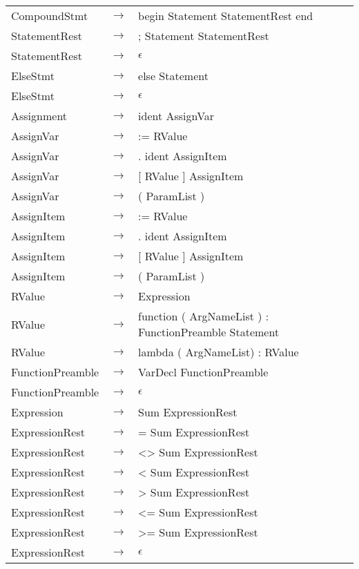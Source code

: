 \documentclass[10pt,a4paper]{article}
\begin{document}
\begin{longtable}{ l c l }
	CompoundStmt     & $\rightarrow$ & begin Statement StatementRest end \\
	
	StatementRest    & $\rightarrow$ & ; Statement StatementRest \\
	StatementRest    & $\rightarrow$ & $\epsilon$ \\

	ElseStmt         & $\rightarrow$ & else Statement \\
	ElseStmt         & $\rightarrow$ & $\epsilon$ \\

	Assignment       & $\rightarrow$ & ident AssignVar \\
	
	AssignVar        & $\rightarrow$ & := RValue \\
	AssignVar        & $\rightarrow$ & . ident AssignItem \\
	AssignVar        & $\rightarrow$ & [ RValue ] AssignItem \\
	AssignVar        & $\rightarrow$ & ( ParamList ) \\

	AssignItem       & $\rightarrow$ & := RValue \\
	AssignItem       & $\rightarrow$ & . ident AssignItem \\
	AssignItem       & $\rightarrow$ & [ RValue ] AssignItem \\
	AssignItem       & $\rightarrow$ & ( ParamList ) \\

	RValue           & $\rightarrow$ & Expression \\
	RValue           & $\rightarrow$ & function ( ArgNameList ) : FunctionPreamble Statement \\
	RValue           & $\rightarrow$ & lambda ( ArgNameList) : RValue \\
	
	FunctionPreamble & $\rightarrow$ & VarDecl FunctionPreamble \\
	FunctionPreamble & $\rightarrow$ & $\epsilon$ \\

	Expression       & $\rightarrow$ & Sum ExpressionRest \\
	
	ExpressionRest   & $\rightarrow$ & = Sum ExpressionRest \\
	ExpressionRest   & $\rightarrow$ & <> Sum ExpressionRest \\
	ExpressionRest   & $\rightarrow$ & < Sum ExpressionRest \\
	ExpressionRest   & $\rightarrow$ & > Sum ExpressionRest \\
	ExpressionRest   & $\rightarrow$ & <= Sum ExpressionRest \\
	ExpressionRest   & $\rightarrow$ & >= Sum ExpressionRest \\
	ExpressionRest   & $\rightarrow$ & $\epsilon$ \\


\end{longtable}
\end{document}
